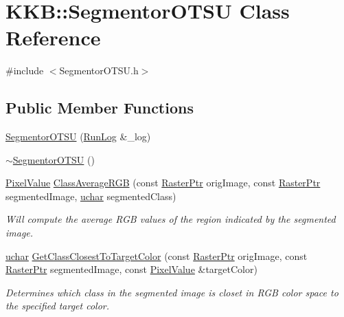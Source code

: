 \hypertarget{class_k_k_b_1_1_segmentor_o_t_s_u}{}\section{K\+KB\+:\+:Segmentor\+O\+T\+SU Class Reference}
\label{class_k_k_b_1_1_segmentor_o_t_s_u}


{\ttfamily \#include $<$Segmentor\+O\+T\+S\+U.\+h$>$}

\subsection*{Public Member Functions}
\begin{DoxyCompactItemize}
\item 
\hyperlink{class_k_k_b_1_1_segmentor_o_t_s_u_a44739a11a421c6a5696cdc0237d7d454}{Segmentor\+O\+T\+SU} (\hyperlink{class_k_k_b_1_1_run_log}{Run\+Log} \&\+\_\+log)
\item 
\hyperlink{class_k_k_b_1_1_segmentor_o_t_s_u_a07aaf4842e4839eb43bd61d5598fd498}{$\sim$\+Segmentor\+O\+T\+SU} ()
\item 
\hyperlink{class_k_k_b_1_1_pixel_value}{Pixel\+Value} \hyperlink{class_k_k_b_1_1_segmentor_o_t_s_u_a664c990335d7847a8d980d2545f99f4d}{Class\+Average\+R\+GB} (const \hyperlink{namespace_k_k_b_a80d46bd24db644a022c863bce8ae3633}{Raster\+Ptr} orig\+Image, const \hyperlink{namespace_k_k_b_a80d46bd24db644a022c863bce8ae3633}{Raster\+Ptr} segmented\+Image, \hyperlink{namespace_k_k_b_ace9969169bf514f9ee6185186949cdf7}{uchar} segmented\+Class)
\begin{DoxyCompactList}\small\item\em Will compute the average R\+GB values of the region indicated by the segmented image. \end{DoxyCompactList}\item 
\hyperlink{namespace_k_k_b_ace9969169bf514f9ee6185186949cdf7}{uchar} \hyperlink{class_k_k_b_1_1_segmentor_o_t_s_u_ad78bcad3976058d44ed131fff819898e}{Get\+Class\+Closest\+To\+Target\+Color} (const \hyperlink{namespace_k_k_b_a80d46bd24db644a022c863bce8ae3633}{Raster\+Ptr} orig\+Image, const \hyperlink{namespace_k_k_b_a80d46bd24db644a022c863bce8ae3633}{Raster\+Ptr} segmented\+Image, const \hyperlink{class_k_k_b_1_1_pixel_value}{Pixel\+Value} \&target\+Color)
\begin{DoxyCompactList}\small\item\em Determines which class in the segmented image is closet in R\+GB color space to the specified target color. \end{DoxyCompactList}\item 

\end{DoxyCompactItemize}
